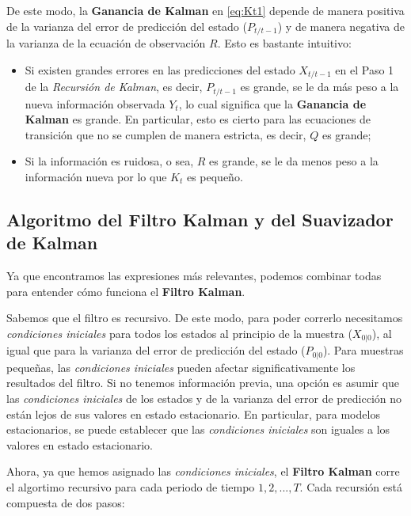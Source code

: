 \documentclass[
]{book}
\begin{document}
De este modo, la \textbf{Ganancia de Kalman} en \eqref{eq:Kt1} depende de manera positiva de la varianza del error de predicción del estado (\(P_{t/t-1}\)) y de manera negativa de la varianza de la ecuación de observación \(R\). Esto es bastante intuitivo:

\begin{itemize}
\item
  Si existen grandes errores en las predicciones del estado \(X_{t/t-1}\) en el Paso 1 de la \emph{Recursión de Kalman}, es decir, \(P_{t/t-1}\) es grande, se le da más peso a la nueva información observada \(Y_t\), lo cual significa que la \textbf{Ganancia de Kalman} es grande. En particular, esto es cierto para las ecuaciones de transición que no se cumplen de manera estricta, es decir, \(Q\) es grande;
\item
  Si la información es ruidosa, o sea, \(R\) es grande, se le da menos peso a la información nueva por lo que \(K_t\) es pequeño.
\end{itemize}

\hypertarget{algoritmo-del-filtro-kalman-y-del-suavizador-de-kalman}{%
\subsection{Algoritmo del Filtro Kalman y del Suavizador de Kalman}\label{algoritmo-del-filtro-kalman-y-del-suavizador-de-kalman}}

Ya que encontramos las expresiones más relevantes, podemos combinar todas para entender cómo funciona el \textbf{Filtro Kalman}.

Sabemos que el filtro es recursivo. De este modo, para poder correrlo necesitamos \emph{condiciones iniciales} para todos los estados al principio de la muestra (\(X_{0|0}\)), al igual que para la varianza del error de predicción del estado (\(P_{0|0}\)). Para muestras pequeñas, las \emph{condiciones iniciales} pueden afectar significativamente los resultados del filtro. Si no tenemos información previa, una opción es asumir que las \emph{condiciones iniciales} de los estados y de la varianza del error de predicción no están lejos de sus valores en estado estacionario. En particular, para modelos estacionarios, se puede establecer que las \emph{condiciones iniciales} son iguales a los valores en estado estacionario.

Ahora, ya que hemos asignado las \emph{condiciones iniciales}, el \textbf{Filtro Kalman} corre el algortimo recursivo para cada periodo de tiempo \(1,2,...,T\). Cada recursión está compuesta de dos pasos:
\end{document}

